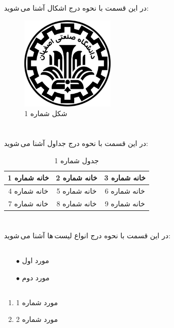 \documentclass{article}
\begin{document}
\section{}
در این قسمت با نحوه درج اشکال آشنا می\,شوید:
\begin{figure}[ht]
    \centering
    \includegraphics[width=0.4\textwidth]{figures/IUT Logo.png}
    \caption{شکل شماره 1}
    \label{fig:fig1}
\end{figure}

\section{}
در این قسمت با نحوه درج جداول آشنا می\,شوید:
\begin{table}[ht]
    \centering
    \begin{tabular}{|c|c|c|}
    \hline
    خانه شماره 1 & خانه شماره 2 & خانه شماره 3\\
    \hline
    خانه شماره 4 & خانه شماره 5 & خانه شماره 6\\
    \hline
    خانه شماره 7 & خانه شماره 8 & خانه شماره 9\\
    \hline
    \end{tabular}
    \caption{جدول شماره 1}
    \label{tab:tab1}
\end{table}

\section{}
در این قسمت با نحوه درج انواع لیست\,ها آشنا می\,شوید:
\subsection{}
\begin{itemize}
    \item [$\bullet$] مورد اول
    \item [$\bullet$] مورد دوم
\end{itemize}
\subsection{}
\begin{enumerate}
    \item مورد شماره 1
    \item مورد شماره 2
\end{enumerate}
\end{document}
